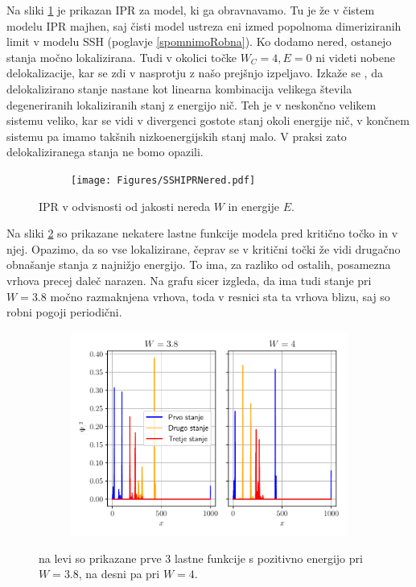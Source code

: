 Na sliki \ref{fig:SSHIPRNered} je prikazan IPR za model, ki ga obravnavamo. Tu je že v čistem modelu IPR majhen, saj čisti model ustreza eni izmed popolnoma dimeriziranih limit v modelu SSH (poglavje \ref{spomnimoRobna}). Ko dodamo nered, ostanejo stanja močno lokalizirana. Tudi v okolici točke $W_C=4, E=0$ ni videti nobene delokalizacije, kar se zdi v nasprotju z našo prejšnjo izpeljavo. Izkaže se \cite{mondragon}, da delokalizirano stanje nastane kot linearna kombinacija velikega števila degeneriranih lokaliziranih stanj z energijo nič. Teh je v neskončno velikem sistemu veliko, kar se vidi v divergenci gostote stanj okoli energije nič, v končnem sistemu pa imamo takšnih nizkoenergijskih stanj malo. V praksi zato delokaliziranega stanja ne bomo opazili.
\begin{figure}[!h]
\centering
\begin{subfigure}{.6\textwidth}
\texttt{[image: Figures/SSHIPRNered.pdf]}
\end{subfigure}
\caption{IPR v odvisnosti od jakosti nereda $W$ in energije $E$.}
\label{fig:SSHIPRNered}
\end{figure} \newpage
Na sliki \ref{fig:EigenPloti} so prikazane nekatere lastne funkcije modela pred kritično točko in v njej. Opazimo, da so vse lokalizirane, čeprav se v kritični točki že vidi drugačno obnašanje stanja z najnižjo energijo. To ima, za razliko od ostalih, posamezna vrhova precej daleč narazen. Na grafu sicer izgleda, da ima tudi stanje pri $W=3.8$ močno razmaknjena vrhova, toda v resnici sta ta vrhova blizu, saj so robni pogoji periodični.
\begin{figure}[!h]
\centering
\begin{subfigure}{.7\textwidth}
\includegraphics[width=\linewidth]{Figures/EigenPloti.pdf}
\end{subfigure}
\caption{na levi so prikazane prve 3 lastne funkcije s pozitivno energijo pri $W=3.8$, na desni pa pri $W=4$.}
\label{fig:EigenPloti}
\end{figure}


